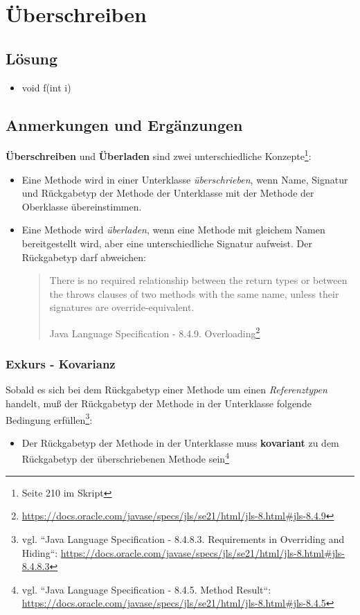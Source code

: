 \chapter{Überschreiben}

\section*{Lösung}

\begin{itemize}
    \item void f(int i)
\end{itemize}


\section*{Anmerkungen und Ergänzungen}

\textbf{Überschreiben} und \textbf{Überladen} sind zwei unterschiedliche Konzepte\footnote{Seite 210 im Skript}:

\begin{itemize}
    \item Eine Methode wird in einer Unterklasse \textit{überschrieben}, wenn Name, Signatur und Rückgabetyp der Methode der Unterklasse mit der
    Methode der Oberklasse übereinstimmen.
    \item Eine Methode wird \textit{überladen}, wenn eine Methode mit gleichem Namen bereitgestellt wird, aber eine unterschiedliche Signatur
    aufweist.
    Der Rückgabetyp darf abweichen:
    \blockquote[Java Language Specification - 8.4.9. Overloading\footnote{\url{https://docs.oracle.com/javase/specs/jls/se21/html/jls-8.html#jls-8.4.9}}]{
        There is no required relationship between the return types or between the throws clauses of two methods with the same name, unless their signatures are override-equivalent.
    }
\end{itemize}

\subsection*{Exkurs - Kovarianz}
Sobald es sich bei dem Rückgabetyp einer Methode um einen \textit{Referenztypen} handelt, muß der Rückgabetyp der Methode in der Unterklasse
folgende Bedingung erfüllen\footnote{
vgl. ``Java Language Specification - 8.4.8.3. Requirements in Overriding and Hiding``: \url{https://docs.oracle.com/javase/specs/jls/se21/html/jls-8.html#jls-8.4.8.3}
}:

\begin{itemize}
    \item Der Rückgabetyp der Methode in der Unterklasse muss \textbf{kovariant} zu dem Rückgabetyp der überschriebenen Methode sein\footnote{
        vgl. ``Java Language Specification - 8.4.5. Method Result``: \url{https://docs.oracle.com/javase/specs/jls/se21/html/jls-8.html#jls-8.4.5}
    }
\end{itemize}

